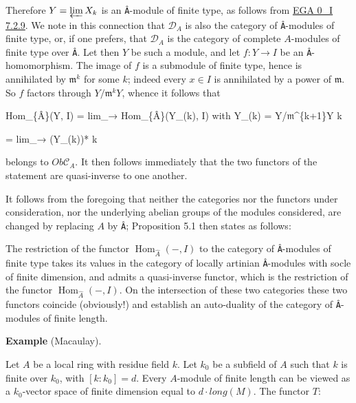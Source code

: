 \documentclass[
  11pt,
  a4paper,
]{book}
\newenvironment{Shaded}{}{}
\newcommand{\NormalTok}[1]{#1}
\begin{document}
Therefore \(Y = \varprojlim X_{k}\) is an \texttt{Â}-module of finite
type, as follows from
\href{https://jcreinhold.github.io/ega/i/00-07-adic-rings.html\#72-adic-rings-and-projective-limits}{EGA
0\_I 7.2.9}. We note in this connection that \(\mathcal{D}_{A}\) is also
the category of \texttt{Â}-modules of finite type, or, if one prefers,
that \(\mathcal{D}_{A}\) is the category of complete \(A\)-modules of
finite type over \texttt{Â}. Let then \(Y\) be such a module, and let
\(f : Y \to I\) be an \texttt{Â}-homomorphism. The image of \(f\) is a
submodule of finite type, hence is annihilated by \(\mathfrak{m}^{k}\)
for some \(k\); indeed every \(x \in I\) is annihilated by a power of
\(\mathfrak{m}\). So \(f\) factors through \(Y/\mathfrak{m}^{k} Y\),
whence it follows that

\begin{Shaded}
\begin{Highlighting}[]
\NormalTok{Hom\_\{Â\}(Y, I) = lim\_→ Hom\_\{Â\}(Y\_(k), I)    with Y\_(k) = Y/𝔪\^{}\{k+1\}Y}
\NormalTok{                  k}

\NormalTok{              = lim\_→ (Y\_(k))*}
\NormalTok{                  k}
\end{Highlighting}
\end{Shaded}

belongs to \(Ob \mathcal{C}_{A}\). It then follows immediately that the
two functors of the statement are quasi-inverse to one another.

It follows from the foregoing that neither the categories nor the
functors under consideration, nor the underlying abelian groups of the
modules considered, are changed by replacing \(A\) by \texttt{Â};
Proposition 5.1 then states as follows:

The restriction of the functor \(\operatorname{Hom}_{\hat{A}}(-, I)\) to
the category of \texttt{Â}-modules of finite type takes its values in
the category of locally artinian \texttt{Â}-modules with socle of finite
dimension, and admits a quasi-inverse functor, which is the restriction
of the functor \(\operatorname{Hom}_{\hat{A}}(-, I)\). On the
intersection of these two categories these two functors coincide
(obviously!) and establish an auto-duality of the category of
\texttt{Â}-modules of finite length.

\textbf{Example} (Macaulay).

Let \(A\) be a local ring with residue field \(k\). Let \(k_{0}\) be a
subfield of \(A\) such that \(k\) is finite over \(k_{0}\), with
\([k : k_{0}] = d\). Every \(A\)-module of finite length can be viewed
as a \(k_{0}\)-vector space of finite dimension equal to
\(d \cdot long(M)\). The functor \(T\):
\end{document}
